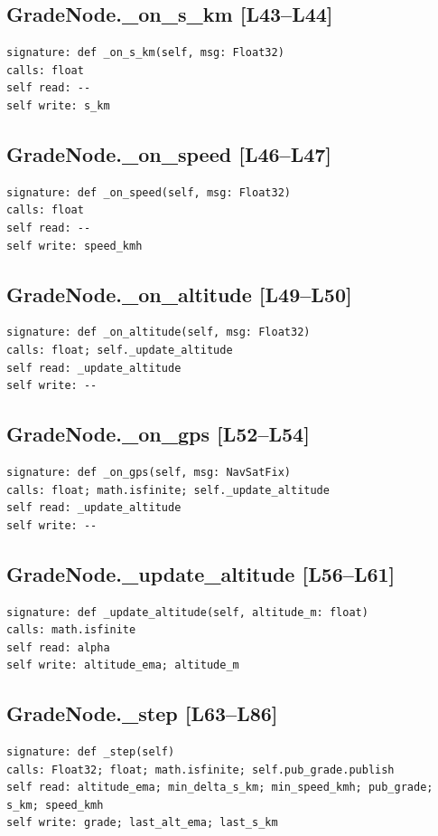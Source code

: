 \documentclass[a4paper,10pt,oneside]{book}
\begin{document}
\subsection*{GradeNode.\_on\_s\_km [L43--L44]}
\begin{lstlisting}[numbers=none]
signature: def _on_s_km(self, msg: Float32)
calls: float
self read: --
self write: s_km
\end{lstlisting}
\subsection*{GradeNode.\_on\_speed [L46--L47]}
\begin{lstlisting}[numbers=none]
signature: def _on_speed(self, msg: Float32)
calls: float
self read: --
self write: speed_kmh
\end{lstlisting}
\subsection*{GradeNode.\_on\_altitude [L49--L50]}
\begin{lstlisting}[numbers=none]
signature: def _on_altitude(self, msg: Float32)
calls: float; self._update_altitude
self read: _update_altitude
self write: --
\end{lstlisting}
\subsection*{GradeNode.\_on\_gps [L52--L54]}
\begin{lstlisting}[numbers=none]
signature: def _on_gps(self, msg: NavSatFix)
calls: float; math.isfinite; self._update_altitude
self read: _update_altitude
self write: --
\end{lstlisting}
\subsection*{GradeNode.\_update\_altitude [L56--L61]}
\begin{lstlisting}[numbers=none]
signature: def _update_altitude(self, altitude_m: float)
calls: math.isfinite
self read: alpha
self write: altitude_ema; altitude_m
\end{lstlisting}
\subsection*{GradeNode.\_step [L63--L86]}
\begin{lstlisting}[numbers=none]
signature: def _step(self)
calls: Float32; float; math.isfinite; self.pub_grade.publish
self read: altitude_ema; min_delta_s_km; min_speed_kmh; pub_grade; s_km; speed_kmh
self write: grade; last_alt_ema; last_s_km
\end{lstlisting}
\end{document}
